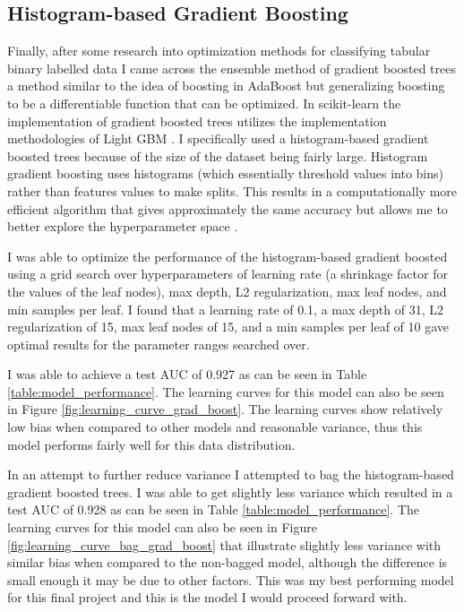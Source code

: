 \documentclass[11pt]{article}
\begin{document}
\subsection*{Histogram-based Gradient Boosting}
Finally, after some research into optimization methods for classifying tabular binary labelled data I came across the ensemble method of gradient boosted trees a method similar to the idea of boosting in AdaBoost but generalizing boosting to be a differentiable function that can be optimized.
In scikit-learn the implementation of gradient boosted trees utilizes the implementation methodologies of Light GBM \cite{ke_lightgbm_2017}.
I specifically used a histogram-based gradient boosted trees because of the size of the dataset being fairly large.
Histogram gradient boosting uses histograms (which essentially threshold values into bins) rather than features values to make splits. 
This results in a computationally more efficient algorithm that gives approximately the same accuracy but allows me to better explore the hyperparameter space \cite{noauthor_111_nodate}.

I was able to optimize the performance of the histogram-based gradient boosted using a grid search over hyperparameters of learning rate (a shrinkage factor for the values of the leaf nodes), max depth, L2 regularization, max leaf nodes, and min samples per leaf.
I found that a learning rate of 0.1, a max depth of 31, L2 regularization of 15, max leaf nodes of 15, and a min samples per leaf of 10 gave optimal results for the parameter ranges searched over.

I was able to achieve a test AUC of 0.927 as can be seen in Table \ref{table:model_performance}. 
The learning curves for this model can also be seen in Figure \ref{fig:learning_curve_grad_boost}.
The learning curves show relatively low bias when compared to other models and reasonable variance, thus this model performs fairly well for this data distribution.

In an attempt to further reduce variance I attempted to bag the histogram-based gradient boosted trees.
I was able to get slightly less variance which resulted in a test AUC of 0.928 as can be seen in Table \ref{table:model_performance}. 
The learning curves for this model can also be seen in Figure \ref{fig:learning_curve_bag_grad_boost} that illustrate slightly less variance with similar bias when compared to the non-bagged model, although the difference is small enough it may be due to other factors.
This was my best performing model for this final project and this is the model I would proceed forward with.
\end{document}
